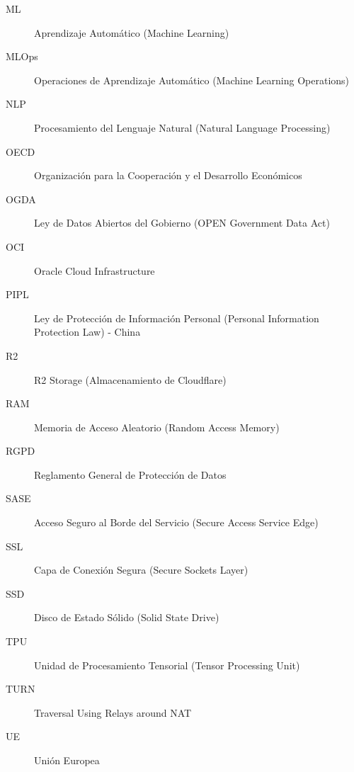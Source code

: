 \begin{description}
	\item[ML] Aprendizaje Automático (Machine Learning)
	\item[MLOps] Operaciones de Aprendizaje Automático (Machine Learning Operations)
	\item[NLP] Procesamiento del Lenguaje Natural (Natural Language Processing)
	\item[OECD] Organización para la Cooperación y el Desarrollo Económicos
	\item[OGDA] Ley de Datos Abiertos del Gobierno (OPEN Government Data Act)
	\item[OCI] Oracle Cloud Infrastructure
	\item[PIPL] Ley de Protección de Información Personal (Personal Information Protection Law) - China
	\item[R2] R2 Storage (Almacenamiento de Cloudflare)
	\item[RAM] Memoria de Acceso Aleatorio (Random Access Memory)
	\item[RGPD] Reglamento General de Protección de Datos
	\item[SASE] Acceso Seguro al Borde del Servicio (Secure Access Service Edge)
	\item[SSL] Capa de Conexión Segura (Secure Sockets Layer)
	\item[SSD] Disco de Estado Sólido (Solid State Drive)
	\item[TPU] Unidad de Procesamiento Tensorial (Tensor Processing Unit)
	\item[TURN] Traversal Using Relays around NAT
	\item[UE] Unión Europea
	
\end{description}


 \newpage
